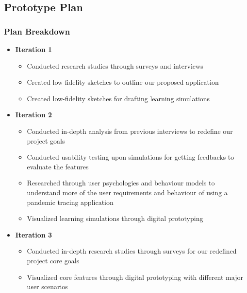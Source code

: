   \subsection{Prototype Plan}
    \subsubsection{Plan Breakdown}
      \begin{itemize}
        \item \textbf{Iteration 1}
          \begin{itemize}
            \item Conducted research studies through surveys and interviews
            \item Created low-fidelity sketches to outline our proposed application
            \item Created low-fidelity sketches for drafting learning simulations
          \end{itemize}
        \item \textbf{Iteration 2}
          \begin{itemize}
            \item Conducted in-depth analysis from previous interviews to redefine our project goals
            \item Conducted usability testing upon simulations for getting feedbacks to evaluate the features
            \item Researched through user psychologies and behaviour models to understand more of the user
            requirements and behaviour of using a pandemic tracing application
            \item Visualized learning simulations through digital prototyping
          \end{itemize}
        \item \textbf{Iteration 3}
          \begin{itemize}
            \item Conducted in-depth research studies through surveys for our redefined project core goals
            \item Visualized core features through digital prototyping with different major user scenarios
          \end{itemize}
      \end{itemize}

